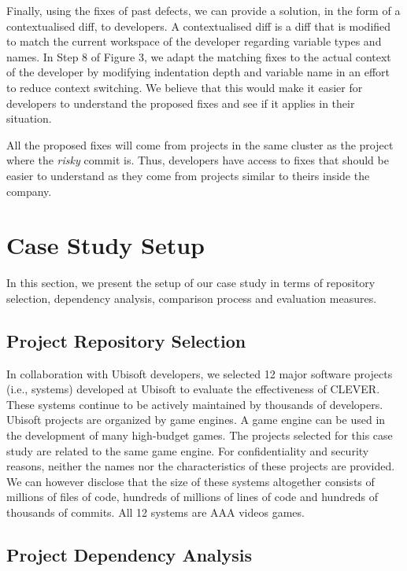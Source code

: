 \documentclass[sigconf]{acmart}
\begin{document}
Finally, using the fixes of past defects, we can provide a solution, in
the form of a contextualised diff, to developers. A contextualised diff
is a diff that is modified to match the current workspace of the
developer regarding variable types and names. In Step 8 of Figure 3, we
adapt the matching fixes to the actual context of the developer by
modifying indentation depth and variable name in an effort to reduce
context switching. We believe that this would make it easier for
developers to understand the proposed fixes and see if it applies in
their situation.

All the proposed fixes will come from projects in the same cluster as
the project where the \emph{risky} commit is. Thus, developers have
access to fixes that should be easier to understand as they come from
projects similar to theirs inside the company.

\section{Case Study Setup}\label{sec:exp}

In this section, we present the setup of our case study in terms of
repository selection, dependency analysis, comparison process and
evaluation measures.

\subsection{Project Repository Selection}\label{sec:rep}

In collaboration with Ubisoft developers, we selected 12 major software
projects (i.e., systems) developed at Ubisoft to evaluate the
effectiveness of CLEVER. These systems continue to be actively
maintained by thousands of developers. Ubisoft projects are organized by
game engines. A game engine can be used in the development of many
high-budget games. The projects selected for this case study are related
to the same game engine. For confidentiality and security reasons,
neither the names nor the characteristics of these projects are
provided. We can however disclose that the size of these systems
altogether consists of millions of files of code, hundreds of millions
of lines of code and hundreds of thousands of commits. All 12 systems
are AAA videos games.

\subsection{Project Dependency Analysis}\label{sec:dependencies}
\end{document}
